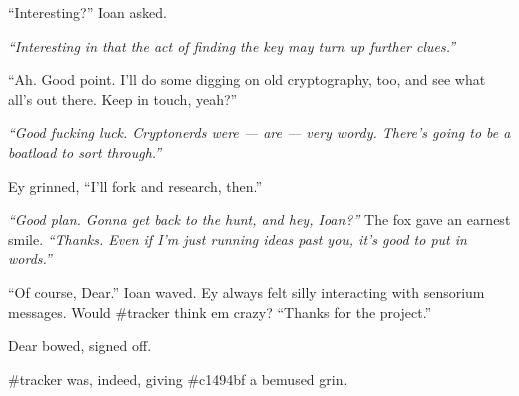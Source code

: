 ``Interesting?'' Ioan asked.

\emph{``Interesting in that the act of finding the key may turn up further clues.''}

``Ah. Good point. I'll do some digging on old cryptography, too, and see what all's out there. Keep in touch, yeah?''

\emph{``Good fucking luck. Cryptonerds were --- are --- very wordy. There's going to be a boatload to sort through.''}

Ey grinned, ``I'll fork and research, then.''

\emph{``Good plan. Gonna get back to the hunt, and hey, Ioan?''} The fox gave an earnest smile. \emph{``Thanks. Even if I'm just running ideas past you, it's good to put in words.''}

``Of course, Dear.'' Ioan waved. Ey always felt silly interacting with sensorium messages. Would \#tracker think em crazy? ``Thanks for the project.''

Dear bowed, signed off.

\#tracker was, indeed, giving \#c1494bf a bemused grin.
